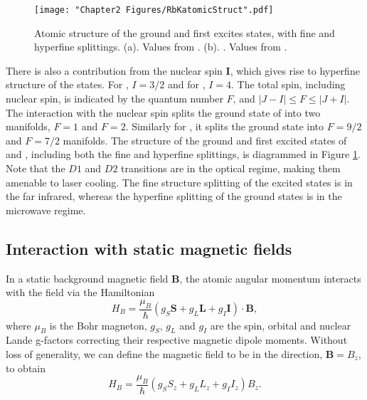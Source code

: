 \begin{figure}
	\texttt{[image: "Chapter2 Figures/RbKatomicStruct".pdf]}
\caption{Atomic structure of the ground and first excites states, with fine and hyperfine splittings. (a)\Rb{}. Values from \cite{Steck}. (b). \K{}. Values from \cite{Tiecke}.}
\label{fig:RbKatomicStruct}
\end{figure}

There is also a contribution from the nuclear spin $\mathbf{I}$, which gives rise to hyperfine structure of the states. For \Rb{}, $I=3/2$ and for \K{}, $I=4$. The total spin, including nuclear spin, is indicated by the quantum number $F$, and $|J - I| \leq F \leq |J + I|$. The interaction with the nuclear spin splits the ground state of \Rb{} into two manifolds, $F=1$ and $F=2$. Similarly for \K{}, it splits the ground state into $F=9/2$ and $F=7/2$ manifolds. The structure of the ground and first excited states of \Rb{} and \K{}, including both the fine and hyperfine splittings, is diagrammed in Figure \ref{fig:RbKatomicStruct}. Note that the $D1$ and $D2$ transitions are in the optical regime, making them amenable to laser cooling. The fine structure splitting of the excited states is in the far infrared, whereas the hyperfine splitting of the ground states is in the microwave regime.  

\subsection{Interaction with static magnetic fields}
In a static background magnetic field $\mathbf{B}$, the atomic angular momentum interacts with the field via the Hamiltonian
\begin{equation}
H_B = \frac{\mu_B}{\hbar}(g_S\mathbf{S}+g_L\mathbf{L}+g_I\mathbf{I})\cdot\mathbf{B},
\end{equation}
where $\mu_B$ is the Bohr magneton, $g_S$, $g_L$ and $g_I$ are the spin, orbital and nuclear Lande g-factors correcting their respective magnetic dipole moments. Without loss of generality, we can define the magnetic field to be in the \ez{} direction, $\mathbf{B}=B_z$\ez{}, to obtain
\begin{equation}
H_B = \frac{\mu_B}{\hbar}(g_S S_z+g_L L_z+g_I I_z) B_z.
\label{eqn:BHam}
\end{equation}

